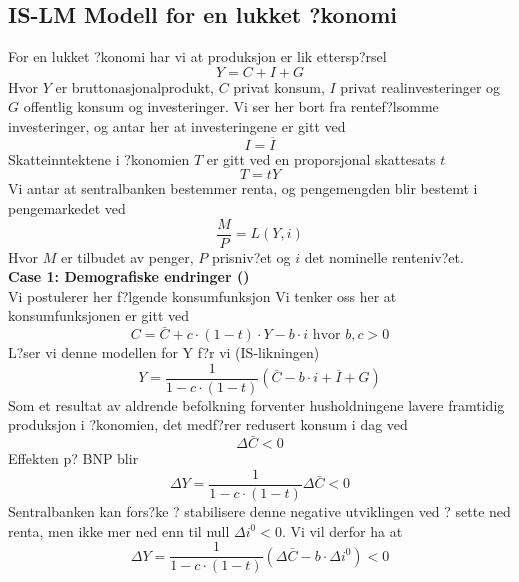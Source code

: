 \documentclass[a4paper,notitlepage]{article}
\begin{document}
\subsection{IS-LM Modell for en lukket ?konomi}
For en lukket ?konomi har vi at produksjon er lik ettersp?rsel
\begin{equation*}
Y=C+I+G
\end{equation*}
Hvor $Y$ er bruttonasjonalprodukt, $C$ privat konsum, $I$ privat realinvesteringer og $G$ offentlig konsum og investeringer.
Vi ser her bort fra rentef?lsomme investeringer, og antar her at investeringene er gitt ved
\begin{equation*}
I=\overline{I}
\end{equation*}
Skatteinntektene i ?konomien $T$ er gitt ved en proporsjonal skattesats $t$
\begin{equation*}
T=tY
\end{equation*}
Vi antar at sentralbanken bestemmer renta, og pengemengden blir bestemt i pengemarkedet ved
\begin{equation*}
\frac{M}{P}=L(Y,i)
\end{equation*}
Hvor $M$ er tilbudet av penger, $P$ prisniv?et og $i$ det nominelle renteniv?et.
\bigskip\\
\noindent \textbf{Case 1: Demografiske endringer (\cite{krugman1998s})}\\
Vi postulerer her f?lgende konsumfunksjon
\noindent Vi tenker oss her at konsumfunksjonen er gitt ved
\begin{equation*}
C=\bar{C}+c\cdot (1-t)\cdot Y-b\cdot i \text{ hvor } b,c>0
\end{equation*}
L?ser vi denne modellen for Y f?r vi (IS-likningen) \\
\begin{equation*}
Y=\frac{1}{1-c\cdot (1-t)}(\bar{C}-b\cdot i+\overline{I}+G)
\end{equation*}
Som et resultat av aldrende befolkning forventer husholdningene lavere framtidig produksjon i ?konomien, det medf?rer redusert konsum i dag ved
\begin{equation*}
\Delta\bar{C}<0
\end{equation*}
Effekten p? BNP blir
\begin{equation*}
\Delta Y=\frac{1}{1-c\cdot (1-t)}\Delta\bar{C}<0
\end{equation*}
Sentralbanken kan fors?ke ? stabilisere denne negative utviklingen ved ? sette ned renta, men ikke mer ned enn til null $\Delta i ^{0}<0$.
Vi vil derfor ha at
\begin{equation*}
\Delta Y=\frac{1}{1-c\cdot (1-t)}(\Delta\bar{C}-b\cdot \Delta i ^{0})<0
\end{equation*}
\end{document}
